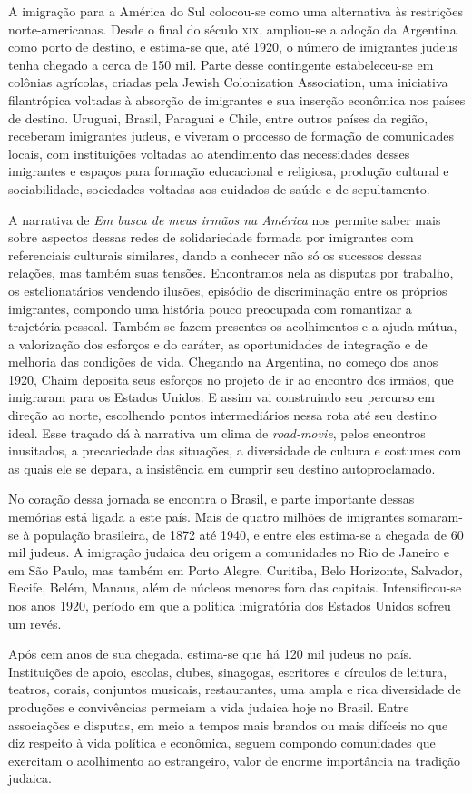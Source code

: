 A imigração para a América do Sul colocou-se como uma alternativa às
restrições norte-americanas. Desde o final do século \textsc{xix}, ampliou-se a
adoção da Argentina como porto de destino, e estima-se que, até 1920, o
número de imigrantes judeus tenha chegado a cerca de 150 mil. Parte
desse contingente estabeleceu-se em colônias agrícolas, criadas pela
Jewish Colonization Association, uma iniciativa filantrópica voltadas à
absorção de imigrantes e sua inserção econômica nos países de destino.
Uruguai, Brasil, Paraguai e Chile, entre outros países da região,
receberam imigrantes judeus, e viveram o processo de formação de
comunidades locais, com instituições voltadas ao atendimento das
necessidades desses imigrantes e espaços para formação educacional e
religiosa, produção cultural e sociabilidade, sociedades voltadas aos
cuidados de saúde e de sepultamento.

A narrativa de \textit{Em busca de meus irmãos na América} nos permite 
saber mais sobre aspectos dessas redes
de solidariedade formada por imigrantes com referenciais culturais
similares, dando a conhecer não só os sucessos dessas relações, mas
também suas tensões. Encontramos nela as disputas por trabalho, os
estelionatários vendendo ilusões, episódio de discriminação entre os
próprios imigrantes, compondo uma história pouco preocupada com
romantizar a trajetória pessoal. Também se fazem presentes 
os acolhimentos e a ajuda mútua, a valorização dos esforços e do
caráter, as oportunidades de integração e de melhoria das condições de
vida. Chegando na Argentina, no começo dos anos 1920, Chaim deposita
seus esforços no projeto de ir ao encontro dos irmãos, que imigraram
para os Estados Unidos. E assim vai construindo seu percurso em direção
ao norte, escolhendo pontos intermediários nessa rota até seu destino
ideal. Esse traçado dá à narrativa um clima de \textit{road-movie}, pelos
encontros inusitados, a precariedade das situações, a diversidade de
cultura e costumes com as quais ele se depara, a insistência em cumprir
seu destino autoproclamado.

No coração dessa jornada se encontra o Brasil, e parte importante dessas
memórias está ligada a este país. Mais de quatro milhões de imigrantes
somaram-se à população brasileira, de 1872 até 1940, e entre eles
estima-se a chegada de 60 mil judeus. A imigração judaica deu origem a
comunidades no Rio de Janeiro e em São Paulo, mas também em Porto Alegre,
Curitiba, Belo Horizonte, Salvador, Recife, Belém, Manaus, além de núcleos
menores fora das capitais. Intensificou-se nos anos 1920, período em que a
politica imigratória dos Estados Unidos sofreu um revés.

Após cem anos de sua chegada, estima-se que há 120 mil judeus no país. Instituições de apoio,
escolas, clubes, sinagogas, escritores e círculos de leitura, teatros,
corais, conjuntos musicais, restaurantes, uma ampla e rica diversidade
de produções e convivências permeiam a vida judaica hoje no Brasil.
Entre associações e disputas, em meio a tempos mais brandos ou mais
difíceis no que diz respeito à vida política e econômica, seguem
compondo comunidades que exercitam o acolhimento ao estrangeiro, valor
de enorme importância na tradição judaica.


